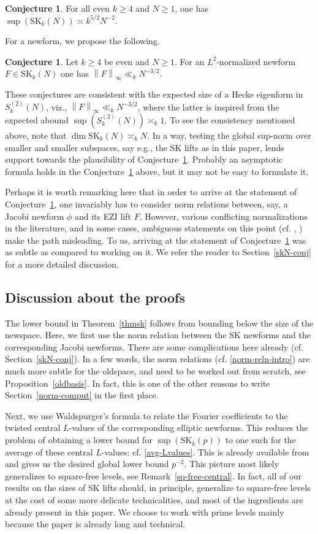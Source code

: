 \documentclass[11pt]{amsart}
\numberwithin{equation}{section}
\theoremstyle{plain}
\theoremstyle{definition}
\newtheorem{conj}[thm]{Conjecture}
\newcommand{\thmref}[1]{Theorem~\ref{#1}}
\newcommand{\propref}[1]{Proposition~\ref{#1}}
\newcommand{\rmkref}[1]{Remark~\ref{#1}}
\newcommand{\conjref}[1]{Conjecture~\ref{#1}}
\newcommand{\mrm}{\mathrm}
\newcommand*{\norm}[1]{\left\lVert#1\right\rVert}
\newcommand{\sktwon}{S_k^{(2)}(N)}
\newcommand{\skkn}{\mrm{SK}_k(N)}
\newcommand{\skkp}{\mrm{SK}_k(p)}
\begin{document}
\begin{conj} \label{sk-conj}
For all even $k \ge 4$ and $N \ge 1$, one has 
     $ \displaystyle \sup(\skkn) \asymp k^{5/2} N^{-2}$.
\end{conj}
For a newform, we propose the following.
\begin{conj} \label{lev-conj}
 Let $k \ge 4$ be even and $N \ge 1$. For an $L^2$-normalized newform $F \in \skkn$ one has $\norm{F}_\infty \ll_k N^{-3/2}$.
\end{conj}
These conjectures are consistent with the expected size of a Hecke eigenform in $\sktwon$, viz., $\displaystyle \norm{F}_\infty \ll_k N^{-3/2}$, where the latter is inspired from the expected abound $\displaystyle \sup(\sktwon)\asymp_k 1$. To see the consistency mentioned above, note that $\dim \skkn \asymp_k N$.
In a way, testing the global sup-norm over smaller and smaller subspaces, say e.g., the SK lifts as in this paper, lends support towards the plausibility of \conjref{lev-conj}. Probably an asymptotic formula holds in the Conjecture~\ref{sk-conj} above, but it may not be easy to formulate it.

Perhaps it is worth remarking here that in order to arrive at the statement of \conjref{sk-conj}, one invariably has to consider norm relations between, say, a Jacobi newform $\phi$ and its EZI lift $F$. However, various conflicting normalizations in the literature, and in some cases, ambiguous statements on this point (cf. \cite{Ag-Br}, \cite{horie}) make the path misleading. To us, arriving at the statement of \conjref{sk-conj} was as subtle as compared to working on it. We refer the reader to Section~\ref{skN-conj} for a more detailed discussion.

\subsection{Discussion about the proofs} The lower bound in \thmref{thmsk} 
 follows from bounding below the size of the newspace. Here, we first use the norm relation between the SK newforms and the corresponding Jacobi newforms. There are some complications here already (cf. Section~\ref{skN-conj}). In a few words, the norm relations (cf. \eqref{norm-reln-intro}) are much more subtle for the oldspace, and need to be worked out from scratch, see \propref{oldbasis}. In fact, this is one of the other reasons to write Section~\ref{norm-comput} in the first place.

Next, we use Waldspurger's formula to relate the Fourier coefficients to the twisted central $L$-values of the corresponding elliptic newforms. This reduces the problem of obtaining a lower bound for $\sup(\skkp)$ to one such for the average of these central $L$-values: cf. \eqref{avg-Lvalues}. This is already available from \cite[Theorem 1.8]{PASD} and gives us the desired global lower bound $p^{-2}$. This picture most likely generalizes to square-free levels, see \rmkref{sq-free-central}. In fact, all of our results on the sizes of SK lifts should, in principle, generalize to square-free levels at the cost of some more delicate technicalities, and most of the ingredients are already present in this paper. We choose to work with prime levels mainly because the paper is already long and technical.
\end{document}
